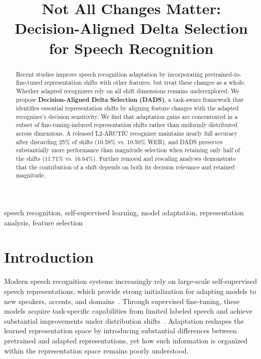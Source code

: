\documentclass{article}
\title{Not All Changes Matter:\\Decision-Aligned Delta Selection for Speech Recognition}
\begin{document}
\ninept
\maketitle

\begin{abstract}
Recent studies improve speech recognition adaptation by incorporating pretrained-to-fine-tuned representation shifts with other features, but treat these changes as a whole. Whether adapted recognizers rely on all shift dimensions remains underexplored. We propose \textbf{Decision-Aligned Delta Selection (DADS)}, a task-aware framework that identifies essential representation shifts by aligning feature changes with the adapted recognizer's decision sensitivity. We find that adaptation gains are concentrated in a subset of fine-tuning-induced representation shifts rather than uniformly distributed across dimensions. A released L2-ARCTIC recognizer maintains nearly full accuracy after discarding 25\% of shifts (10.58\% vs. 10.50\% WER), and DADS preserves substantially more performance than magnitude selection when retaining only half of the shifts (11.71\% vs. 16.64\%). Further removal and rescaling analyses demonstrate that the contribution of a shift depends on both its decision relevance and retained magnitude.
\end{abstract}

\begin{keywords}
speech recognition, self-supervised learning, model adaptation, representation analysis, feature selection
\end{keywords}

\section{Introduction}
\label{sec:intro}
Modern speech recognition systems increasingly rely on large-scale self-supervised speech representations, which provide strong initialization for adapting models to new speakers, accents, and domains~\cite{mohamed2022review,baevski2020wav2vec,hsu2021hubert,chen2022wavlm,baevski2022data2vec,yang2021superb}. Through supervised fine-tuning, these models acquire task-specific capabilities from limited labeled speech and achieve substantial improvements under distribution shifts~\cite{thai2026contrastive,hu2022lora,bagat2025maslora}. Adaptation reshapes the learned representation space by introducing substantial differences between pretrained and adapted representations, yet how such information is organized within the representation space remains poorly understood.
\end{document}

